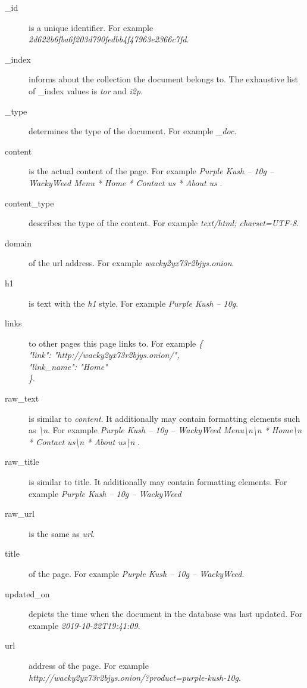 \begin {description}
	\item[\_id \label{DWDataList}] is a unique identifier. For example\\ \textit{2d622b6fba6f203d790fedbb4f47963e2366c7fd}.
	\item[\_index] informs about the collection the document belongs to. The exhaustive list of _index values is \textit{tor} and \textit{i2p}. 
	\item[\_type] determines the type of the document. For example \textit{\_doc}.
	\item[content] is the actual content of the page. For example \textit{Purple Kush – 10g – WackyWeed Menu    * Home   * Contact us   * About us }.
	\item[content\_type] describes the type of the content. For example \textit{text/html; charset=UTF-8}.
	\item[domain] of the url address. For example \textit{wacky2yx73r2bjys.onion}.
	\item[h1] is text with the \textit{h1} style. For example \textit{Purple Kush – 10g}.
	\item[links] to other pages this page links to. For example \textit{\{\\
  "link": "http://wacky2yx73r2bjys.onion/",\\
  "link\_name": "Home"\\
\}}.
	\item[raw\_text] is similar to \textit{content}. It additionally may contain formatting elements such as \textit{\textbackslash n}. For example \textit{Purple Kush – 10g – WackyWeed Menu\textbackslash n\textbackslash n  * Home\textbackslash n  * Contact us\textbackslash n  * About us\textbackslash n }.
	\item[raw\_title] is similar to title. It additionally may contain formatting elements. For example \textit{Purple Kush – 10g – WackyWeed}
	\item[raw\_url] is the same as \textit{url}.
	\item[title] of the page. For example \textit{Purple Kush – 10g – WackyWeed}.
	\item[updated\_on] depicts the time when the document in the database was last updated. For example \textit{2019-10-22T19:41:09}.
	\item[url] address of the page. For example \\ \textit{http://wacky2yx73r2bjys.onion/?product=purple-kush-10g}.
\end{description}


